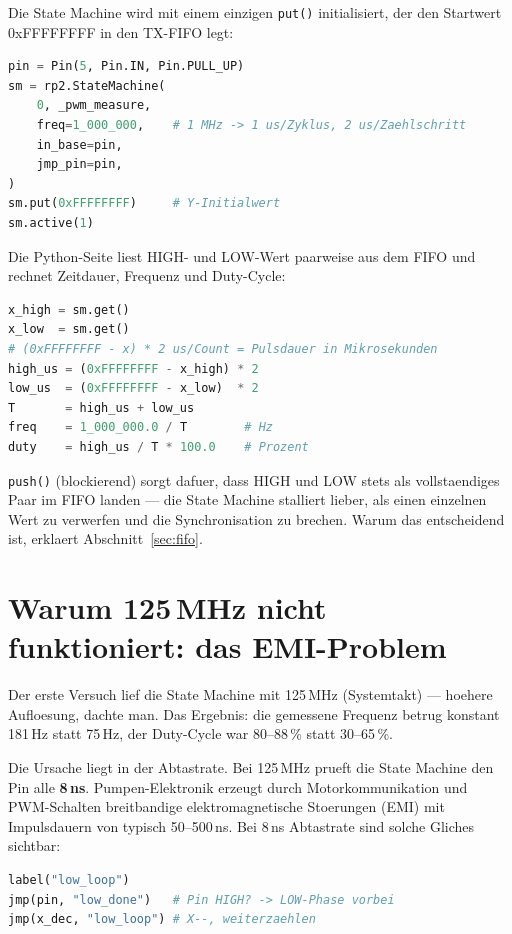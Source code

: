 \documentclass[11pt,a4paper]{article}
\begin{document}
Die State Machine wird mit einem einzigen \texttt{put()} initialisiert,
der den Startwert 0xFFFFFFFF in den TX-FIFO legt:

\begin{lstlisting}[language=Python, caption={Initialisierung der State Machine}]
pin = Pin(5, Pin.IN, Pin.PULL_UP)
sm = rp2.StateMachine(
    0, _pwm_measure,
    freq=1_000_000,    # 1 MHz -> 1 us/Zyklus, 2 us/Zaehlschritt
    in_base=pin,
    jmp_pin=pin,
)
sm.put(0xFFFFFFFF)     # Y-Initialwert
sm.active(1)
\end{lstlisting}

Die Python-Seite liest HIGH- und LOW-Wert paarweise aus dem FIFO
und rechnet Zeitdauer, Frequenz und Duty-Cycle:

\begin{lstlisting}[language=Python, caption={Auswertung: Frequenz und Duty-Cycle aus Zaehlerstand}]
x_high = sm.get()
x_low  = sm.get()
# (0xFFFFFFFF - x) * 2 us/Count = Pulsdauer in Mikrosekunden
high_us = (0xFFFFFFFF - x_high) * 2
low_us  = (0xFFFFFFFF - x_low)  * 2
T       = high_us + low_us
freq    = 1_000_000.0 / T        # Hz
duty    = high_us / T * 100.0    # Prozent
\end{lstlisting}

\texttt{push()} (blockierend) sorgt dafuer, dass HIGH und LOW stets als
vollstaendiges Paar im FIFO landen --- die State Machine stalliert lieber,
als einen einzelnen Wert zu verwerfen und die Synchronisation zu brechen.
Warum das entscheidend ist, erklaert Abschnitt~\ref{sec:fifo}.

\section{Warum 125\,MHz nicht funktioniert: das EMI-Problem}

Der erste Versuch lief die State Machine mit 125\,MHz (Systemtakt) ---
hoehere Aufloesung, dachte man.
Das Ergebnis: die gemessene Frequenz betrug konstant 181\,Hz statt 75\,Hz,
der Duty-Cycle war 80--88\,\% statt 30--65\,\%.

Die Ursache liegt in der Abtastrate.
Bei 125\,MHz prueft die State Machine den Pin alle \textbf{8\,ns}.
Pumpen-Elektronik erzeugt durch Motorkommunikation und PWM-Schalten
breitbandige elektromagnetische Stoerungen (EMI) mit Impulsdauern
von typisch 50--500\,ns.
Bei 8\,ns Abtastrate sind solche Gliches sichtbar:

\begin{lstlisting}[language=Python, caption={LOW-Schleife bei 125 MHz: EMI-Glitch beendet Messung}]
label("low_loop")
jmp(pin, "low_done")   # Pin HIGH? -> LOW-Phase vorbei
jmp(x_dec, "low_loop") # X--, weiterzaehlen
\end{lstlisting}
\end{document}
